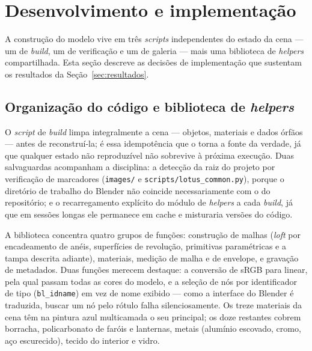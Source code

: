 \section{Desenvolvimento e implementa\c{c}\~ao}
\label{sec:desenvolvimento}

A constru\c{c}\~ao do modelo vive em tr\^es \emph{scripts} independentes do estado da
cena --- um de \emph{build}, um de verifica\c{c}\~ao e um de galeria --- mais uma biblioteca de
\emph{helpers} compartilhada. Esta se\c{c}\~ao descreve as decis\~oes de implementa\c{c}\~ao
que sustentam os resultados da Se\c{c}\~ao~\ref{sec:resultados}.

\subsection{Organiza\c{c}\~ao do c\'odigo e biblioteca de \emph{helpers}}

O \emph{script} de \emph{build} limpa integralmente a cena --- objetos, materiais e dados
\'orf\~aos --- antes de reconstru\'i-la; \'e essa idempot\^encia que o torna a fonte da
verdade, j\'a que qualquer estado n\~ao reproduz\'ivel n\~ao sobrevive \`a pr\'oxima
execu\c{c}\~ao. Duas salvaguardas acompanham a disciplina: a detec\c{c}\~ao da raiz do
projeto por verifica\c{c}\~ao de marcadores (\texttt{images/} e
\texttt{scripts/lotus\_common.py}), porque o diret\'orio de trabalho do Blender n\~ao
coincide necessariamente com o do reposit\'orio; e o recarregamento expl\'icito do
m\'odulo de \emph{helpers} a cada \emph{build}, j\'a que em sess\~oes longas ele
permanece em cache e misturaria vers\~oes do c\'odigo.

A biblioteca concentra quatro grupos de fun\c{c}\~oes: constru\c{c}\~ao de malhas
(\emph{loft} por encadeamento de an\'eis, superf\'icies de revolu\c{c}\~ao, primitivas
param\'etricas e a tampa descrita adiante), materiais, medi\c{c}\~ao de malha e de
envelope, e grava\c{c}\~ao de metadados. Duas fun\c{c}\~oes merecem destaque: a
convers\~ao de sRGB para linear, pela qual passam todas as cores do modelo, e a
sele\c{c}\~ao de n\'os por identificador de tipo (\texttt{bl\_idname}) em vez de nome
exibido --- como a interface do Blender \'e traduzida, buscar um n\'o pelo r\'otulo
falha silenciosamente. Os treze materiais da cena t\^em na pintura azul multicamada o
seu principal; os doze restantes cobrem borracha, policarbonato de far\'ois e lanternas,
metais (alum\'inio escovado, cromo, a\c{c}o escurecido), tecido do interior e vidro.

